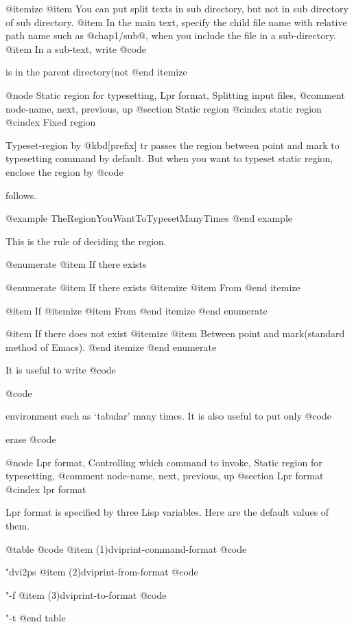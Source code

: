 {{{{{{{{@itemize
@item You can put split texts in sub directory, but not in
 sub directory of sub directory.
@item In the main text, specify the child file name with relative path name
 such as @{chap1/sub@}, when you include the file in
 a sub-directory.
@item In a sub-text, write @code{%
 is in the parent directory(not %
@end itemize

@node Static region for typesetting, Lpr format, Splitting input files, %
@comment  node-name,  next,  previous,  up
@section Static region
@cindex static region
@cindex Fixed region

  Typeset-region by @kbd{[prefix] tr} passes the region between point and
mark to typesetting command by default.  But when you want to typeset
static region, enclose the region by @code{%
follows.

@example
          TheRegionYouWantToTypesetManyTimes
@end example

This is the rule of deciding the region.

@enumerate
@item
If there exists %

@enumerate
@item
If there exists %
@itemize
@item From %
@end itemize

@item
If %
@itemize
@item From %
@end itemize
@end enumerate

@item
If there does not exist %
@itemize
@item Between point and mark(standard method of Emacs).
@end itemize
@end enumerate

  It is useful to write @code{%
@code{%
environment such as `tabular' many times.  It is also useful to put only
@code{%
erase @code{%

@node Lpr format, Controlling which command to invoke, Static region for typesetting, %
@comment  node-name,  next,  previous,  up
@section Lpr format
@cindex lpr format

  Lpr format is specified by three Lisp variables.  Here are the
default values of them.

@table @code
@item (1)dviprint-command-format
        @code{"dvi2ps %
@item (2)dviprint-from-format
        @code{"-f %
@item (3)dviprint-to-format
        @code{"-t %
@end table

}}}}}}}}}}}}}}}}}
